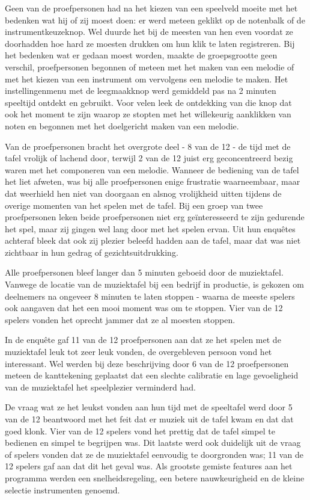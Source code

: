 \documentclass{acm}
\begin{document}
Geen van de proefpersonen had na het kiezen van een speelveld moeite met het bedenken wat hij of zij moest doen: er werd meteen geklikt op de notenbalk of de instrumentkeuzeknop. Wel duurde het bij de meesten van hen even voordat ze doorhadden hoe hard ze moesten drukken om hun klik te laten registreren. Bij het bedenken wat er gedaan moest worden, maakte de groepsgrootte geen verschil, proefpersonen begonnen of meteen met het maken van een melodie of met het kiezen van een instrument om vervolgens een melodie te maken. Het instellingenmenu met de leegmaakknop werd gemiddeld pas na 2 minuten speeltijd ontdekt en gebruikt. Voor velen leek de ontdekking van die knop dat ook het moment te zijn waarop ze stopten met het willekeurig aanklikken van noten en begonnen met het doelgericht maken van een melodie.

Van de proefpersonen bracht het overgrote deel - 8 van de 12 - de tijd met de tafel vrolijk of lachend door, terwijl 2 van de 12 juist erg geconcentreerd bezig waren met het componeren van een melodie. Wanneer de bediening van de tafel het liet afweten, was bij alle proefpersonen enige frustratie waarneembaar, maar dat weerhield hen niet van doorgaan en alsnog vrolijkheid uitten tijdens de overige momenten van het spelen met de tafel. Bij een groep van twee proefpersonen leken beide proefpersonen niet erg geïnteresseerd te zijn gedurende het spel, maar zij gingen wel lang door met het spelen ervan. Uit hun enquêtes achteraf bleek dat ook zij plezier beleefd hadden aan de tafel, maar dat was niet zichtbaar in hun gedrag of gezichtsuitdrukking.

Alle proefpersonen bleef langer dan 5 minuten geboeid door de muziektafel. Vanwege de locatie van de muziektafel bij een bedrijf in productie, is gekozen om deelnemers na ongeveer 8 minuten te laten stoppen - waarna de meeste spelers ook aangaven dat het een mooi moment was om te stoppen. Vier van de 12 spelers vonden het oprecht jammer dat ze al moesten stoppen.

In de enquête gaf 11 van de 12 proefpersonen aan dat ze het spelen met de muziektafel leuk tot zeer leuk vonden, de overgebleven persoon vond het interessant. Wel werden bij deze beschrijving door 6 van de 12 proefpersonen meteen de kanttekening geplaatst dat een slechte calibratie en lage gevoeligheid van de muziektafel het speelplezier verminderd had.

De vraag wat ze het leukst vonden aan hun tijd met de speeltafel werd door 5 van de 12 beantwoord met het feit dat er muziek uit de tafel kwam en dat dat goed klonk. Vier van de 12 spelers vond het prettig dat de tafel simpel te bedienen en simpel te begrijpen was. Dit laatste werd ook duidelijk uit de vraag of spelers vonden dat ze de muziektafel eenvoudig te doorgronden was; 11 van de 12 spelers gaf aan dat dit het geval was. Als grootste gemiste features aan het programma werden een snelheidsregeling, een betere nauwkeurigheid en de kleine selectie instrumenten genoemd.
\end{document}
